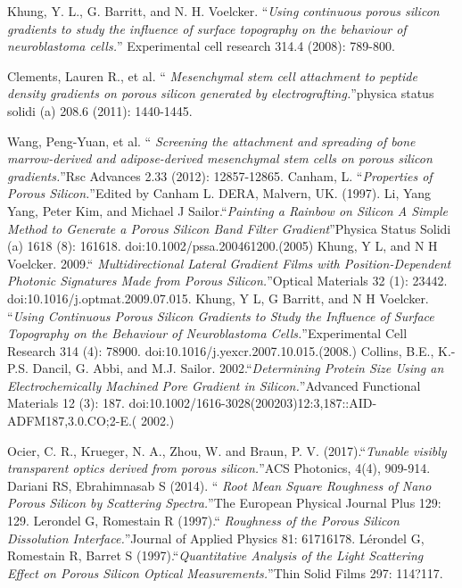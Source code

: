 \documentclass{article}
\begin{document}
\begin{thebibliography}{X}
 Khung, Y. L., G. Barritt, and
  N. H. Voelcker. \textquotedblleft \emph{Using continuous porous
    silicon gradients to study the influence of surface topography
    on the behaviour of neuroblastoma cells.}\textquotedblright
  Experimental cell research 314.4 (2008): 789-800.

 Clements, Lauren R., et al. \textquotedblleft
  \emph{Mesenchymal stem cell attachment to peptide density
    gradients on porous silicon generated by
    electrografting.}\textquotedblright physica status solidi (a)
  208.6 (2011): 1440-1445.

 Wang, Peng-Yuan, et al. \textquotedblleft
  \emph{Screening the attachment and spreading of bone
    marrow-derived and adipose-derived mesenchymal stem cells on
    porous silicon gradients.}\textquotedblright Rsc Advances 2.33
  (2012): 12857-12865.
 Canham, L. \textquotedblleft \emph{Properties of
    Porous Silicon.}\textquotedblright Edited by Canham L. DERA,
  Malvern, UK. (1997).
 Li, Yang Yang, Peter Kim, and Michael J
  Sailor.\textquotedblleft \emph{Painting a Rainbow on Silicon A
    Simple Method to Generate a Porous Silicon Band Filter
    Gradient}\textquotedblright Physica Status Solidi (a) 1618 (8):
  161618. doi:10.1002/pssa.200461200.(2005)
 Khung, Y L, and N H
  Voelcker. 2009.\textquotedblleft\emph{ Multidirectional Lateral
    Gradient Films with Position-Dependent Photonic Signatures Made
    from Porous Silicon.}\textquotedblright Optical Materials 32
  (1): 23442. doi:10.1016/j.optmat.2009.07.015.
  Khung, Y L, G Barritt, and N H Voelcker.
  \textquotedblleft \emph{Using Continuous Porous Silicon Gradients
    to Study the Influence of Surface Topography on the Behaviour of
    Neuroblastoma Cells.}\textquotedblright Experimental Cell
  Research 314 (4): 78900. doi:10.1016/j.yexcr.2007.10.015.(2008.)
 Collins, B.E., K.-P.S. Dancil, G. Abbi, and
  M.J. Sailor. 2002.\textquotedblleft \emph{Determining Protein Size
    Using an Electrochemically Machined Pore Gradient in
    Silicon.}\textquotedblright Advanced Functional Materials 12 (3):
  187. doi:10.1002/1616-3028(200203)12:3,187::AID-ADFM187,3.0.CO;2-E.(
  2002.)

 Ocier, C. R., Krueger, N. A., Zhou, W. and  Braun,
  P. V. (2017).\textquotedblleft \emph{Tunable visibly transparent
    optics derived from porous silicon.}\textquotedblright ACS
  Photonics, 4(4), 909-914.
 Dariani RS, Ebrahimnasab S (2014). \textquotedblleft
  \emph{Root Mean Square Roughness of Nano Porous Silicon by
    Scattering Spectra.}\textquotedblright The
  European Physical Journal Plus 129: 129.
 Lerondel G, Romestain R (1997).\textquotedblleft
  \emph{Roughness of the Porous Silicon Dissolution
    Interface.}\textquotedblright Journal of Applied Physics 81:
  61716178.
 Lérondel G, Romestain R, Barret S
  (1997).\textquotedblleft \emph{Quantitative Analysis of the Light
    Scattering Effect on Porous Silicon
    Optical Measurements.}\textquotedblright Thin Solid Films 297:
  114?117.


\end{thebibliography}
\end{document}
